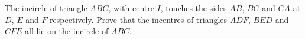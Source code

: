 The incircle of triangle $ABC$, with centre $I$, touches the sides $AB$, $BC$ and $CA$ at $D$, $E$ and $F$ respectively. Prove that the incentres of triangles $ADF$, $BED$ and $CFE$ all lie on the incircle of $ABC$.

